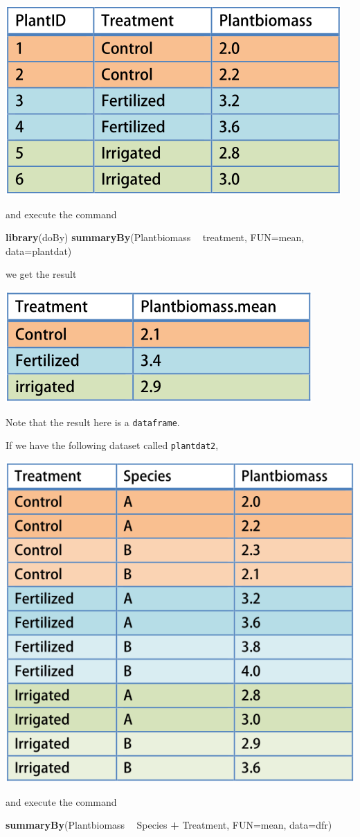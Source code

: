 \documentclass[]{book}
\newenvironment{Shaded}{\begin{snugshade}}{\end{snugshade}}
\newcommand{\DataTypeTok}[1]{\textcolor[rgb]{0.13,0.29,0.53}{#1}}
\newcommand{\KeywordTok}[1]{\textcolor[rgb]{0.13,0.29,0.53}{\textbf{#1}}}
\newcommand{\NormalTok}[1]{#1}
\newcommand{\OperatorTok}[1]{\textcolor[rgb]{0.81,0.36,0.00}{\textbf{#1}}}
\newcommand{\StringTok}[1]{\textcolor[rgb]{0.31,0.60,0.02}{#1}}
\begin{document}
\includegraphics[width=0.33\linewidth]{screenshots/exampledata}

and execute the command

\begin{Shaded}
\begin{Highlighting}[]
\KeywordTok{library}\NormalTok{(doBy)}
\KeywordTok{summaryBy}\NormalTok{(Plantbiomass }\OperatorTok{~}\StringTok{ }\NormalTok{treatment, }\DataTypeTok{FUN=}\NormalTok{mean, }\DataTypeTok{data=}\NormalTok{plantdat)}
\end{Highlighting}
\end{Shaded}

we get the result

\includegraphics[width=0.33\linewidth]{screenshots/summarybyresult}

Note that the result here is a \texttt{dataframe}.

If we have the following dataset called \texttt{plantdat2},

\includegraphics[width=0.33\linewidth]{screenshots/exampledatalarger}

and execute the command

\begin{Shaded}
\begin{Highlighting}[]
\KeywordTok{summaryBy}\NormalTok{(Plantbiomass }\OperatorTok{~}\StringTok{ }\NormalTok{Species }\OperatorTok{+}\StringTok{ }\NormalTok{Treatment, }\DataTypeTok{FUN=}\NormalTok{mean, }\DataTypeTok{data=}\NormalTok{dfr)}
\end{Highlighting}
\end{Shaded}
\end{document}

